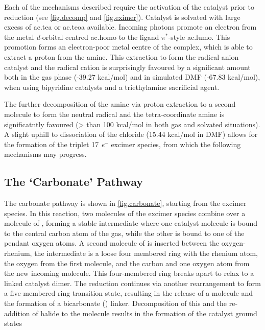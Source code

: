 Each of the mechanisms described require the activation of the catalyst prior to  reduction (see \autoref{fig.decomp} and \autoref{fig.eximer}). Catalyst is solvated with large excess of \gls{ac.tea} or \gls{ac.teoa} available. Incoming photons promote an electron from the metal \textit{d}-orbital centred \gls{ac.homo} to the ligand $\pi^\ast$-style \gls{ac.lumo}. This promotion forms an electron-poor metal centre of the complex, which is able to extract a proton from the amine. This extraction to form the radical anion catalyst and the radical cation is surprisingly favoured by a significant amount both in the gas phase (-39.27 kcal/mol) and in simulated DMF (-67.83 kcal/mol), when using bipyridine catalysts and a triethylamine sacrificial agent.

The further decomposition of the amine via proton extraction to a second molecule to form the neutral radical and the tetra-coordinate amine is significatntly favoured (> than 100 kcal/mol in both gas and solvated situations). A slight uphill to dissociation of the chloride (15.44 kcal/mol in DMF) allows for the formation of the triplet 17 \textit{e}$^-$ excimer species, from which the following mechanisms may progress.


\subsection{The `Carbonate' Pathway}\label{ss.carbonate}

The carbonate pathway is shown in \autoref{fig.carbonate}, starting from the excimer species. In this reaction, two molecules of the excimer species combine over a molecule of , forming a stable intermediate where one catalyst molecule is bound to the central carbon atom of the gas, while the other is bound to one of the pendant oxygen atoms. A second molecule of  is inserted between the oxygen-rhenium, the intermediate is a loose four membered ring with the rhenium atom, the oxygen from the first  molecule, and the carbon and one oxygen atom from the new incoming molecule. This four-membered ring breaks apart to relax to a  linked catalyst dimer. The  reduction continues via another rearrangement to form a five-membered ring transition state, resulting in the release of a  molecule and the formation of a bicarbonate () linker. Decomposition of this and the re-addition of halide to the molecule results in the formation of the catalyst ground states

